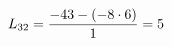 \documentclass[preview]{standalone}
\begin{document}
\begin{align*}
\special{dvisvgm:raw <g id='unique000'>}L_{32}=\frac{-43-(-8\cdot 6)}{1}=5\special{dvisvgm:raw </g>}
\end{align*}
\end{document}
